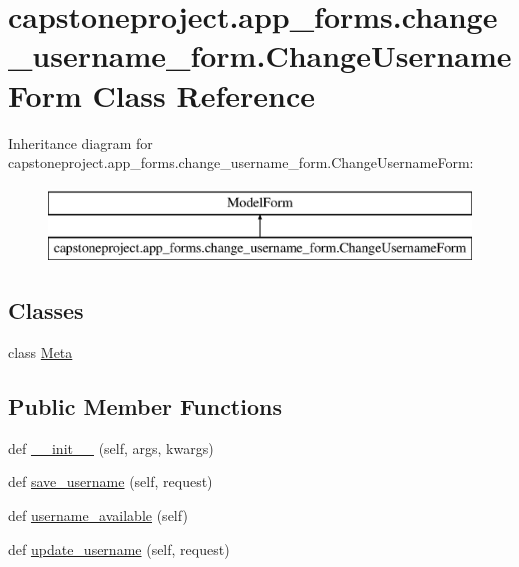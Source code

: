 \hypertarget{classcapstoneproject_1_1app__forms_1_1change__username__form_1_1_change_username_form}{}\section{capstoneproject.\+app\+\_\+forms.\+change\+\_\+username\+\_\+form.\+Change\+Username\+Form Class Reference}
\label{classcapstoneproject_1_1app__forms_1_1change__username__form_1_1_change_username_form}
Inheritance diagram for capstoneproject.\+app\+\_\+forms.\+change\+\_\+username\+\_\+form.\+Change\+Username\+Form\+:\begin{figure}[H]
\begin{center}
\leavevmode
\includegraphics[height=2.000000cm]{classcapstoneproject_1_1app__forms_1_1change__username__form_1_1_change_username_form}
\end{center}
\end{figure}
\subsection*{Classes}
\begin{DoxyCompactItemize}
\item 
class \mbox{\hyperlink{classcapstoneproject_1_1app__forms_1_1change__username__form_1_1_change_username_form_1_1_meta}{Meta}}
\end{DoxyCompactItemize}
\subsection*{Public Member Functions}
\begin{DoxyCompactItemize}
\item 
def \mbox{\hyperlink{classcapstoneproject_1_1app__forms_1_1change__username__form_1_1_change_username_form_af257301620a3acf3d4fbaaa99e3f323a}{\+\_\+\+\_\+init\+\_\+\+\_\+}} (self, args, kwargs)
\item 
def \mbox{\hyperlink{classcapstoneproject_1_1app__forms_1_1change__username__form_1_1_change_username_form_a93d6a2a8896661d0c1933e3bfc337266}{save\+\_\+username}} (self, request)
\item 
def \mbox{\hyperlink{classcapstoneproject_1_1app__forms_1_1change__username__form_1_1_change_username_form_af8ac9857d82522799b9955f544166490}{username\+\_\+available}} (self)
\item 
def \mbox{\hyperlink{classcapstoneproject_1_1app__forms_1_1change__username__form_1_1_change_username_form_a609f6bd1c233e118e149ff585cef44e8}{update\+\_\+username}} (self, request)
\end{DoxyCompactItemize}
